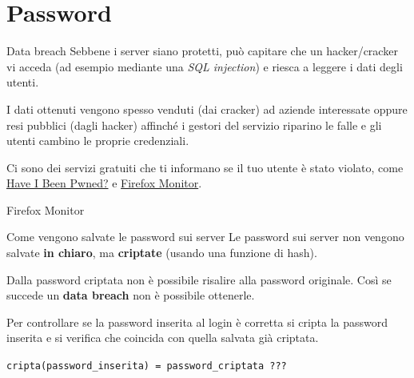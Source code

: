  \section{Password}

\begin{myframe}{Data breach}
  Sebbene i server siano protetti, può capitare che un hacker/cracker vi acceda (ad esempio mediante una \emph{SQL injection}) e riesca a leggere i dati degli utenti.

  \pause\medskip
  I dati ottenuti vengono spesso venduti (dai cracker) ad aziende interessate oppure resi pubblici (dagli hacker) affinché i gestori del servizio riparino le falle e gli utenti cambino le proprie credenziali.

  \pause\medskip
  Ci sono dei servizi gratuiti che ti informano se il tuo utente è stato violato, come \href{https://haveibeenpwned.com/}{Have I Been Pwned?} e \href{https://monitor.firefox.com/}{Firefox Monitor}.
\end{myframe}

\begin{myframe}{Firefox Monitor}
\end{myframe}

\begin{myframe}{Come vengono salvate le password sui server}
  Le password sui server non vengono salvate \textbf{in chiaro}, ma \textbf{criptate} (usando una funzione di hash).

  \pause\medskip
  Dalla password criptata non è possibile risalire alla password originale. Così se succede un \textbf{data breach} non è possibile ottenerle.

  \pause\medskip
  Per controllare se la password inserita al login è corretta si cripta la password inserita e si verifica che coincida con quella salvata già criptata.

  \texttt{cripta(password\_inserita) = password\_criptata ???}
\end{myframe}


